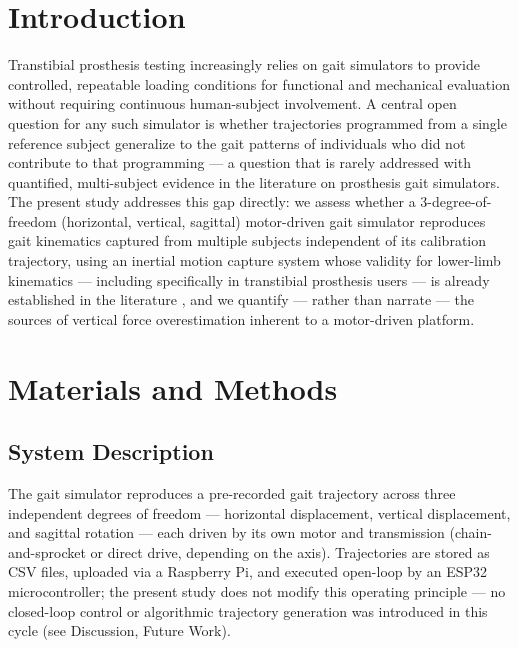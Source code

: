 \documentclass[bioengineering,article,submit,moreauthors]{Definitions/mdpi}
\begin{document}
\section{Introduction}

Transtibial prosthesis testing increasingly relies on gait simulators to
provide controlled, repeatable loading conditions for functional and
mechanical evaluation without requiring continuous human-subject
involvement. A central open question for any such simulator is whether
trajectories programmed from a single reference subject generalize to
the gait patterns of individuals who did not contribute to that
programming --- a question that is rarely addressed with quantified,
multi-subject evidence in the literature on prosthesis gait simulators.
The present study addresses this gap directly: we assess whether a
3-degree-of-freedom (horizontal, vertical, sagittal) motor-driven gait
simulator reproduces gait kinematics captured from multiple subjects
independent of its calibration trajectory, using an inertial motion
capture system whose validity for lower-limb kinematics --- including
specifically in transtibial prosthesis users --- is already established
in the literature \cite{PENDIENTE_iSen_transtibial}, and we quantify ---
rather than narrate --- the sources of vertical force overestimation
inherent to a motor-driven platform.

\section{Materials and Methods}

\subsection{System Description}

The gait simulator reproduces a pre-recorded gait trajectory across
three independent degrees of freedom --- horizontal displacement,
vertical displacement, and sagittal rotation --- each driven by its own
motor and transmission (chain-and-sprocket or direct drive, depending on
the axis). Trajectories are stored as CSV files, uploaded via a
Raspberry Pi, and executed open-loop by an ESP32 microcontroller; the
present study does not modify this operating principle --- no
closed-loop control or algorithmic trajectory generation was introduced
in this cycle (see Discussion, Future Work). %
\end{document}
